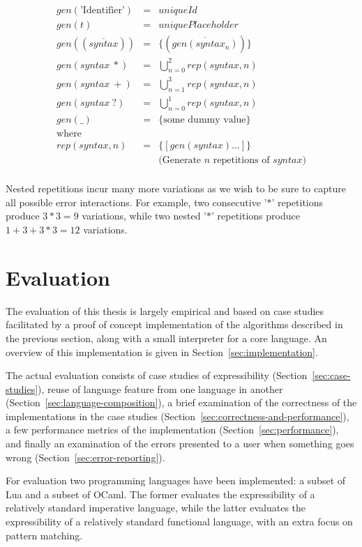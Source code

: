 \documentclass{kththesis}
\begin{document}
$$
\begin{array}{rcl}
gen(\text{'Identifier'}) & = & uniqueId \\
gen(t) & = & uniquePlaceholder \\
gen((\overline{syntax})) & = & \{(\overline{gen(syntax_n)})\} \\
gen(syntax~*) & = & \bigcup_{n=0}^2 rep(syntax, n) \\
gen(syntax~+) & = & \bigcup_{n=1}^3 rep(syntax, n) \\
gen(syntax~?) & = & \bigcup_{n=0}^1 rep(syntax, n) \\
gen(\_) & = & \{\text{some dummy value}\} \\
\text{where} & & \\
rep(syntax, n) & = & \{[gen(syntax)\ldots]\} \\
& & \text{(Generate $n$ repetitions of $syntax$)} \\
\end{array}
$$

Nested repetitions incur many more variations as we wish to be sure to capture all possible error interactions. For example, two consecutive '$*$' repetitions produce $3 * 3 = 9$ variations, while two nested '$*$' repetitions produce $1 + 3 + 3*3 = 12$ variations.

\chapter{Evaluation} \label{sec:evaluation}

The evaluation of this thesis is largely empirical and based on case studies facilitated by a proof of concept implementation of the algorithms described in the previous section, along with a small interpreter for a core language. An overview of this implementation is given in Section~\ref{sec:implementation}.

The actual evaluation consists of case studies of expressibility (Section~\ref{sec:case-studies}), reuse of language feature from one language in another (Section~\ref{sec:language-composition}), a brief examination of the correctness of the implementations in the case studies (Section~\ref{sec:correctness-and-performance}), a few performance metrics of the implementation (Section~\ref{sec:performance}), and finally an examination of the errors presented to a user when something goes wrong (Section~\ref{sec:error-reporting}).

For evaluation two programming languages have been implemented: a subset of Lua and a subset of OCaml. The former evaluates the expressibility of a relatively standard imperative language, while the latter evaluates the expressibility of  a relatively standard functional language, with an extra focus on pattern matching.
\end{document}
